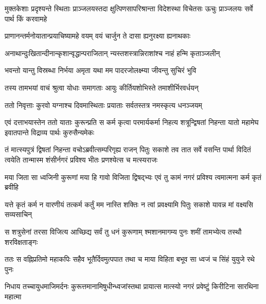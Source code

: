 \threelineshloka
{मुक्तकेशाः प्रदृश्यन्ते स्थिताः प्राञ्जलयस्तदा}
{क्षुत्पिणसापरिश्रान्ता विदेशस्था विचेतसः}
{ऊचुः प्राञ्जलयः सर्वे पार्थ किं करवामहे}


\twolineshloka
{प्राणानन्तर्मनोयातान्प्रयाचिष्यामहे वयम्}
{वयं चार्जुन ते दासा ह्यनुरक्ष्या ह्यनाथकाः}




\twolineshloka
{अनाथान्दुःखितान्दीनान्कृशान्वृद्धान्पराजितान्}
{न्यस्तशस्त्रान्निराशांश्च नाहं हन्मि कृताञ्जलीन्}


\twolineshloka
{भवन्तो यान्तु विस्रब्धा निर्भया अमृता यथा}
{मम पादरजोलक्ष्म्या जीवन्तु सुचिरं भुवि}


\twolineshloka
{तस्य तामभयां वाचं श्रुत्वा योधाः समागताः}
{आयुः कीर्तियशोभिस्ते तमाशीर्भिरवर्धयन्}


\twolineshloka
{ततो निवृत्ताः कुरवो यग्नाश्च दिवमास्थिताः}
{प्रयाताः सर्वतस्तत्र नमस्कृत्य धनञ्जयम्}


\onelineshloka
{एवं दत्ताभयास्तेन ततो याताः कुरून्प्रति}
\twolineshloka
{स कर्म कृत्वा परमार्यकर्मा निहत्य शत्रून्द्विषतां निहन्ता}
{यातो महामेघ इवातपान्ते विद्राव्य पार्थः कुरुसैन्यमेकः}


\onelineshloka
{तं मात्स्यपुत्रं द्विषतां निहन्ता वचोऽब्रवीत्सम्परिगृह्य राजन्}
\twolineshloka
{पितुः सकाशे तव तात सर्वे वसन्ति पार्था विदितं त्वयेति}
{तान्मास्म शंसीर्नगरं प्रविश्य भीतः प्रणश्येत्स च मत्स्यराजः}


\twolineshloka
{मया जिता सा ध्वजिनी कुरूणां मया हि गावो विजिता द्विषद्भ्यः}
{एवं तु कामं नगरं प्रविश्य त्वमात्मना कर्म कृतं ब्रवीहि}




\twolineshloka
{यत्ते कृतं कर्म न वारणीयं तत्कर्म कर्तुं मम नास्ति शक्तिः}
{न त्वां प्रवक्ष्यामि पितुः सकाशे यावन्न मां वक्ष्यसि सव्यसाचिन्}




\twolineshloka
{स शत्रुसेनां तरसा विजित्य आच्छिद्य सर्वं तु धनं कुरूणाम्}
{श्मशानमागम्य पुनः शमीं तामभ्येत्य तस्थौ शरविक्षताङ्गः}


\twolineshloka
{ततः स वह्निप्रतिमो महाकपिः सहैव भूतैर्दिवमुत्पपात}
{तथा च माया विहिता बभूव सा ध्वजं च सिंहं युयुजे रथे पुनः}


\twolineshloka
{निधाय तच्चायुधमाजिमर्दनः कुरूत्तमानामिषुधीन्ध्वजांस्तथा}
{प्रायात्स मात्स्यो नगरं प्रवेष्टुं किरीटिना सारथिना महात्मा}


